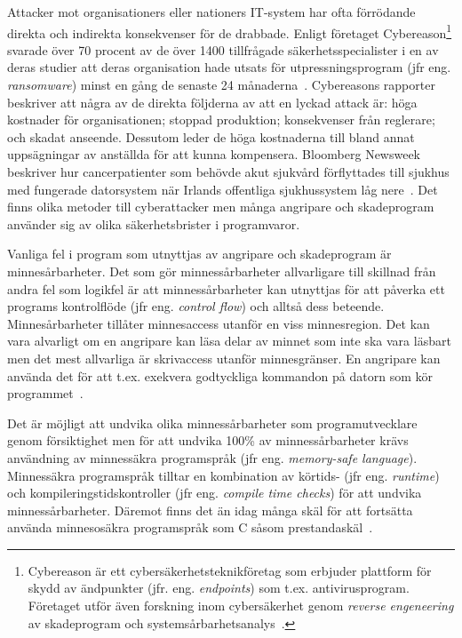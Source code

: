 Attacker mot organisationers eller nationers IT-system har ofta förrödande
direkta och indirekta konsekvenser för de drabbade. Enligt företaget
Cybereason\footnote{Cybereason är ett cybersäkerhetsteknikföretag som erbjuder
plattform för skydd av ändpunkter (jfr. eng. \emph{endpoints}) som t.ex.
antivirusprogram. Företaget utför även forskning inom cybersäkerhet genom
\emph{reverse engeneering} av skadeprogram och
systemsårbarhetsanalys~\cite{enwiki:1147596623}.} svarade över 70 procent av de
över 1400 tillfrågade säkerhetsspecialister i en
av deras studier att deras organisation hade utsats för
utpressningsprogram (jfr eng. \emph{ransomware}) minst en gång de senaste
24 månaderna~\cite{cyberreason2021, cyberreason2022}. Cybereasons rapporter
beskriver att några av de direkta följderna av att en lyckad attack är: höga
kostnader för organisationen; stoppad produktion; konsekvenser från reglerare;
och skadat anseende. Dessutom leder de höga kostnaderna till
bland annat uppsägningar av anställda för att kunna kompensera. Bloomberg
Newsweek~\cite{gallagher2023} beskriver hur cancerpatienter som behövde akut
sjukvård förflyttades till sjukhus med fungerade datorsystem när Irlands
offentliga sjukhussystem låg nere~\cite{hse_report}. Det finns olika
metoder till cyberattacker men många angripare och skadeprogram använder sig av
olika säkerhetsbrister i programvaror.

Vanliga fel i program som utnyttjas av angripare och skadeprogram är
minnesårbarheter. Det som gör minnessårbarheter allvarligare till skillnad från
andra fel som logikfel är att minnessårbarheter kan utnyttjas för att påverka
ett programs kontrolflöde (jfr eng. \emph{control flow}) och alltså dess
beteende. Minnesårbarheter tillåter minnesaccess utanför en viss minnesregion.
Det kan vara alvarligt om en angripare kan läsa delar av minnet som inte ska
vara läsbart men det mest allvarliga är skrivaccess utanför minnesgränser. En
angripare kan använda det för att t.ex. exekvera godtyckliga kommandon på
datorn som kör programmet~\cite{computer_security_cs161}.

Det är möjligt att undvika olika minnessårbarheter som
programutvecklare genom försiktighet men för att undvika 100\% av
minnessårbarheter krävs användning av minnessäkra programspråk (jfr eng.
\emph{memory-safe language}).
Minnessäkra programspråk tilltar en kombination av körtids- (jfr eng.
\emph{runtime}) och kompileringstidskontroller (jfr eng. \emph{compile time
checks}) för att undvika minnessårbarheter. Däremot finns det än idag många
skäl för att fortsätta använda minnesosäkra programspråk som
C såsom prestandaskäl~\cite{computer_security_cs161}.

